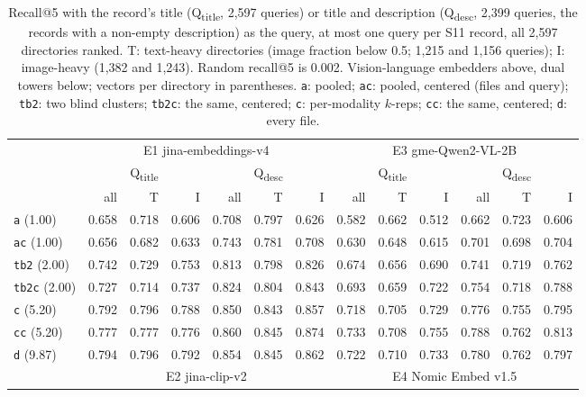 \documentclass[11pt]{article}
\newcommand{\rep}[1]{\texttt{#1}}
\begin{document}
\begin{table}[t]
\centering\small
\caption{Recall@5 with the record's title (Q\textsubscript{title}, 2,597 queries) or title and description (Q\textsubscript{desc}, 2,399 queries, the records with a non-empty description) as the query, at most one query per S11 record, all 2,597 directories ranked. T: text-heavy directories (image fraction below 0.5; 1,215 and 1,156 queries); I: image-heavy (1,382 and 1,243). Random recall@5 is 0.002. Vision-language embedders above, dual towers below; vectors per directory in parentheses. \rep{a}: pooled; \rep{ac}: pooled, centered (files and query); \rep{tb2}: two blind clusters; \rep{tb2c}: the same, centered; \rep{c}: per-modality $k$-reps; \rep{cc}: the same, centered; \rep{d}: every file.}
\label{tab:nlq}
\setlength{\tabcolsep}{4pt}
\begin{tabular}{lrrrrrrrrrrrr}
\toprule
& \multicolumn{6}{c}{E1 jina-embeddings-v4} & \multicolumn{6}{c}{E3 gme-Qwen2-VL-2B} \\
\cmidrule(lr){2-7}\cmidrule(lr){8-13}
 & \multicolumn{3}{c}{Q\textsubscript{title}} & \multicolumn{3}{c}{Q\textsubscript{desc}} & \multicolumn{3}{c}{Q\textsubscript{title}} & \multicolumn{3}{c}{Q\textsubscript{desc}} \\
\cmidrule(lr){2-4}\cmidrule(lr){5-7}\cmidrule(lr){8-10}\cmidrule(lr){11-13}
 & all & T & I & all & T & I & all & T & I & all & T & I \\
\midrule
\rep{a} (1.00) & 0.658 & 0.718 & 0.606 & 0.708 & 0.797 & 0.626 & 0.582 & 0.662 & 0.512 & 0.662 & 0.723 & 0.606 \\
\rep{ac} (1.00) & 0.656 & 0.682 & 0.633 & 0.743 & 0.781 & 0.708 & 0.630 & 0.648 & 0.615 & 0.701 & 0.698 & 0.704 \\
\rep{tb2} (2.00) & 0.742 & 0.729 & 0.753 & 0.813 & 0.798 & 0.826 & 0.674 & 0.656 & 0.690 & 0.741 & 0.719 & 0.762 \\
\rep{tb2c} (2.00) & 0.727 & 0.714 & 0.737 & 0.824 & 0.804 & 0.843 & 0.693 & 0.659 & 0.722 & 0.754 & 0.718 & 0.788 \\
\rep{c} (5.20) & 0.792 & 0.796 & 0.788 & 0.850 & 0.843 & 0.857 & 0.718 & 0.705 & 0.729 & 0.776 & 0.755 & 0.795 \\
\rep{cc} (5.20) & 0.777 & 0.777 & 0.776 & 0.860 & 0.845 & 0.874 & 0.733 & 0.708 & 0.755 & 0.788 & 0.762 & 0.813 \\
\rep{d} (9.87) & 0.794 & 0.796 & 0.792 & 0.854 & 0.845 & 0.862 & 0.722 & 0.710 & 0.733 & 0.780 & 0.762 & 0.797 \\
\midrule
 & \multicolumn{6}{c}{E2 jina-clip-v2} & \multicolumn{6}{c}{E4 Nomic Embed v1.5} \\

\end{tabular}
\end{table}
\end{document}
